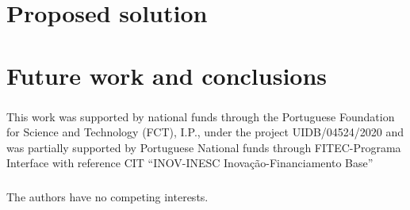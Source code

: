 \documentclass[runningheads]{llncs}
\begin{document}
\section{Proposed solution}
\label{sec:solution}


\section{Future work and conclusions}
\label{sec:conclusions}

\begin{credits}
\subsubsection{\ackname} This work was supported by national funds through the Portuguese Foundation for Science and Technology (FCT), I.P., under the project UIDB/04524/2020 and was partially supported by Portuguese National funds through FITEC-Programa Interface with reference CIT “INOV-INESC Inovação-Financiamento Base”

\subsubsection{\discintname}
The authors have no competing interests.
\end{credits}
%
%
%


%
\end{document}
